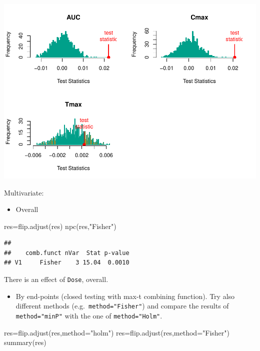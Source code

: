 \documentclass[
]{article}
\newenvironment{Shaded}{\begin{snugshade}}{\end{snugshade}}
\newcommand{\AttributeTok}[1]{\textcolor[rgb]{0.77,0.63,0.00}{#1}}
\newcommand{\FunctionTok}[1]{\textcolor[rgb]{0.00,0.00,0.00}{#1}}
\newcommand{\NormalTok}[1]{#1}
\newcommand{\OtherTok}[1]{\textcolor[rgb]{0.56,0.35,0.01}{#1}}
\newcommand{\StringTok}[1]{\textcolor[rgb]{0.31,0.60,0.02}{#1}}
\providecommand{\tightlist}{%
  \setlength{\itemsep}{0pt}\setlength{\parskip}{0pt}}
\begin{document}
\begin{center}\includegraphics{perm_files/figure-latex/unnamed-chunk-46-1} \end{center}

Multivariate:

\begin{itemize}
\tightlist
\item
  Overall
\end{itemize}

\begin{Shaded}
\begin{Highlighting}[]
\NormalTok{res}\OtherTok{=}\FunctionTok{flip.adjust}\NormalTok{(res)}
\FunctionTok{npc}\NormalTok{(res,}\StringTok{"Fisher"}\NormalTok{)}
\end{Highlighting}
\end{Shaded}

\begin{verbatim}
## 
##    comb.funct nVar  Stat p-value
## V1     Fisher    3 15.04  0.0010
\end{verbatim}

There is an effect of \texttt{Dose}, overall.

\begin{itemize}
\tightlist
\item
  By end-points (closed testing with max-t combining function). Try also
  different methods (e.g.~\texttt{method="Fisher"}) and compare the
  results of \texttt{method="minP"} with the one of
  \texttt{method="Holm"}.
\end{itemize}

\begin{Shaded}
\begin{Highlighting}[]
\NormalTok{res}\OtherTok{=}\FunctionTok{flip.adjust}\NormalTok{(res,}\AttributeTok{method=}\StringTok{"holm"}\NormalTok{)}
\NormalTok{res}\OtherTok{=}\FunctionTok{flip.adjust}\NormalTok{(res,}\AttributeTok{method=}\StringTok{"Fisher"}\NormalTok{)}
\FunctionTok{summary}\NormalTok{(res)}
\end{Highlighting}
\end{Shaded}
\end{document}
